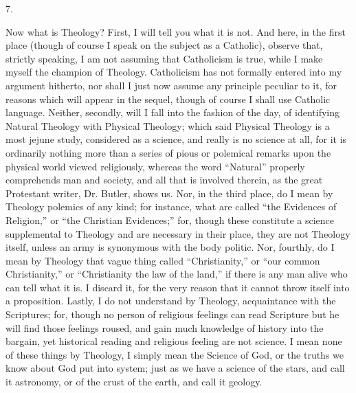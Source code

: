 7.

Now what is Theology? First, I will tell you what it is not. And
here, in the first place (though of course I speak on the subject as a
Catholic), observe that, strictly speaking, I am not assuming that
Catholicism is true, while I make myself the champion of Theology.
Catholicism has not formally entered into my argument hitherto, nor
shall I just now assume any principle peculiar to it, for reasons
which will appear in the sequel, though of course I shall use
Catholic language. Neither, secondly, will I fall into the fashion of
the day, of identifying Natural Theology with Physical Theology; which
said Physical Theology is a most jejune study, considered as a
science, and really is no science at all, for it is ordinarily nothing
more than a series of pious or polemical remarks upon the physical
world viewed religiously, whereas the word ``Natural''
properly comprehends man and society, and all that is involved
therein, as the great Protestant writer, Dr. Butler, shows us. Nor, in
the third place, do I mean by Theology polemics of any kind; for
instance, what are called ``the Evidences of Religion,'' or
``the Christian Evidences;'' for, though these constitute a
science supplemental to Theology and are necessary in their place,
they are not Theology itself, unless an army is synonymous with the
body politic. Nor, fourthly, do I mean by Theology that vague thing
called ``Christianity,'' or ``our common
Christianity,'' or ``Christianity the law of the land,''
if there is any man alive who can tell what it is. I discard it, for
the very reason that it cannot throw itself into a proposition.
Lastly, I do not understand by Theology, acquaintance with the
Scriptures; for, though no person of religious feelings can read
Scripture but he will find those feelings roused, and gain much
knowledge of history into the bargain, yet historical reading and
religious feeling are not science. I mean none of these things by
Theology, I simply mean the Science of God, or the truths we know
about God put into system; just as we have a science of the stars, and
call it astronomy, or of the crust of the earth, and call it geology.

